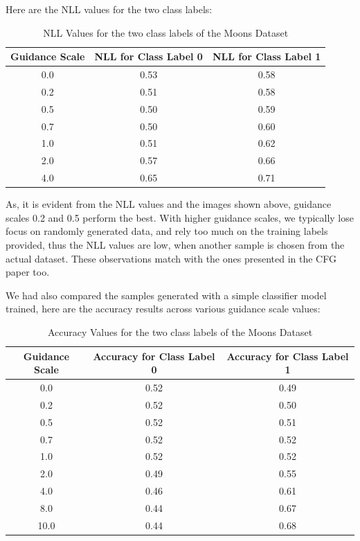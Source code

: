 \documentclass[a4paper,12pt]{article}
\begin{document}
Here are the NLL values for the two class labels:

\begin{table}[h]
  \centering
  \begin{tabular}{|c|c|c|}
      \hline
      {\bf Guidance Scale} & {\bf NLL for Class Label 0} & {\bf NLL for Class Label 1} \\
      \hline
      0.0 & 0.53 & 0.58 \\
      0.2 & 0.51 & 0.58 \\
      0.5 & 0.50 & 0.59 \\
      0.7 & 0.50 & 0.60 \\
      1.0 & 0.51 & 0.62 \\
      2.0 & 0.57 & 0.66 \\
      4.0 & 0.65 & 0.71 \\
      \hline
  \end{tabular}
  \caption{NLL Values for the two class labels of the Moons Dataset}
  \label{tab:nll_values}
\end{table}


As, it is evident from the NLL values and the images shown above, guidance scales 0.2 and 0.5 perform the best. With higher guidance scales, we typically lose focus on randomly generated data, and rely too much on the training labels provided, thus the NLL values are low, when another sample is chosen from the actual dataset. These observations match with the ones presented in the CFG paper too.


We had also compared the samples generated with a simple classifier model trained, here are the accuracy results across various guidance scale values:



\begin{table}[h]
  \centering
  \begin{tabular}{|c|c|c|}
      \hline
      {\bf Guidance Scale} & {\bf Accuracy for Class Label 0} & {\bf Accuracy for Class Label 1} \\
      \hline
      0.0 & 0.52 & 0.49 \\
      0.2 & 0.52 & 0.50 \\
      0.5 & 0.52 & 0.51 \\
      0.7 & 0.52 & 0.52 \\
      1.0 & 0.52 & 0.52 \\
      2.0 & 0.49 & 0.55 \\
      4.0 & 0.46 & 0.61 \\
      8.0 & 0.44 & 0.67 \\
      10.0 & 0.44 & 0.68 \\
      \hline
  \end{tabular}
  \caption{Accuracy Values for the two class labels of the Moons Dataset}
  \label{tab:acc_values}
\end{table}
\end{document}
